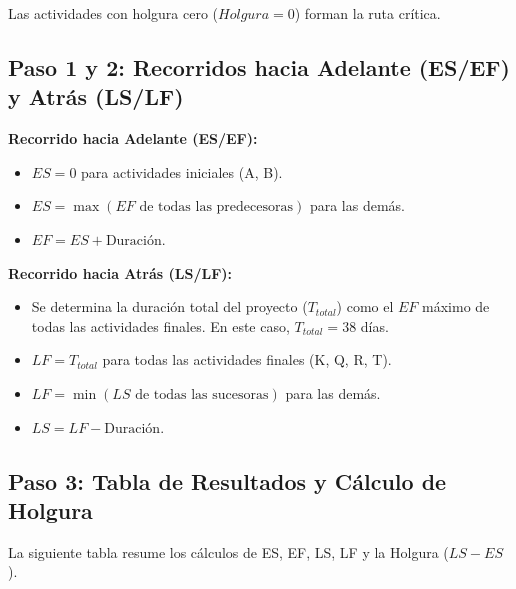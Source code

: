 \documentclass[a4paper,9pt]{article}
\begin{document}
Las actividades con holgura cero ($Holgura = 0$) forman la ruta crítica.

\subsection*{Paso 1 y 2: Recorridos hacia Adelante (ES/EF) y Atrás (LS/LF)}
\textbf{Recorrido hacia Adelante (ES/EF):}
\begin{itemize}
    \item $ES = 0$ para actividades iniciales (A, B).
    \item $ES = \max(EF \text{ de todas las predecesoras})$ para las demás.
    \item $EF = ES + \text{Duración}$.
\end{itemize}

\textbf{Recorrido hacia Atrás (LS/LF):}
\begin{itemize}
    \item Se determina la duración total del proyecto ($T_{total}$) como el $EF$ máximo de todas las actividades finales. En este caso, $T_{total} = 38$ días.
    \item $LF = T_{total}$ para todas las actividades finales (K, Q, R, T).
    \item $LF = \min(LS \text{ de todas las sucesoras})$ para las demás.
    \item $LS = LF - \text{Duración}$.
\end{itemize}

\subsection*{Paso 3: Tabla de Resultados y Cálculo de Holgura}
La siguiente tabla resume los cálculos de ES, EF, LS, LF y la Holgura ($LS - ES$).
\end{document}
